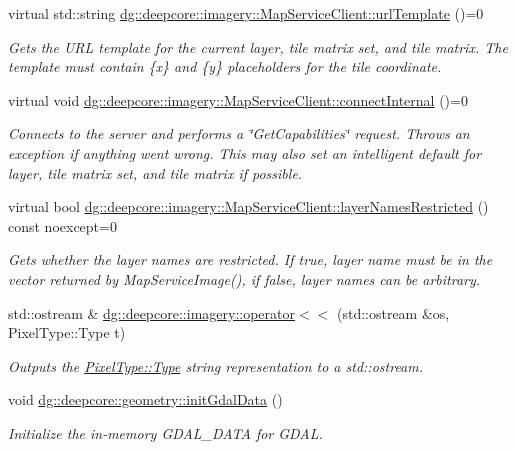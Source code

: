 \begin{DoxyCompactItemize}
virtual std\+::string \hyperlink{group___imagery_module_gaafa4e8cc2a047f6467e227603ccf1a23}{dg\+::deepcore\+::imagery\+::\+Map\+Service\+Client\+::url\+Template} ()=0
\begin{DoxyCompactList}\small\item\em Gets the U\+RL template for the current layer, tile matrix set, and tile matrix. The template must contain \{x\} and \{y\} placeholders for the tile coordinate. \end{DoxyCompactList}\item 
virtual void \hyperlink{group___imagery_module_gabba13ea72115a1196ed44e35cc17f1b9}{dg\+::deepcore\+::imagery\+::\+Map\+Service\+Client\+::connect\+Internal} ()=0
\begin{DoxyCompactList}\small\item\em Connects to the server and performs a \char`\"{}\+Get\+Capabilities\char`\"{} request. Throws an exception if anything went wrong. This may also set an intelligent default for layer, tile matrix set, and tile matrix if possible. \end{DoxyCompactList}\item 
virtual bool \hyperlink{group___imagery_module_ga900665eb2167743cdac5e46ac536c209}{dg\+::deepcore\+::imagery\+::\+Map\+Service\+Client\+::layer\+Names\+Restricted} () const noexcept=0
\begin{DoxyCompactList}\small\item\em Gets whether the layer names are restricted. If true, layer name must be in the vector returned by Map\+Service\+Image(), if false, layer names can be arbitrary. \end{DoxyCompactList}\item 
std\+::ostream \& \hyperlink{group___imagery_module_ga46f637f6cee80168d9ad3724aa75c7df}{dg\+::deepcore\+::imagery\+::operator$<$$<$} (std\+::ostream \&os, Pixel\+Type\+::\+Type t)
\begin{DoxyCompactList}\small\item\em Outputs the \hyperlink{namespacedg_1_1deepcore_1_1imagery_1_1_pixel_type_a5f0c62edf4601cbd15e52b381697069d}{Pixel\+Type\+::\+Type} string representation to a {\ttfamily std\+::ostream}. \end{DoxyCompactList}\item 
void \hyperlink{group___imagery_module_ga44c5fa041d6209a58a20bc5f4791aecc}{dg\+::deepcore\+::geometry\+::init\+Gdal\+Data} ()
\begin{DoxyCompactList}\small\item\em Initialize the in-\/memory G\+D\+A\+L\+\_\+\+D\+A\+TA for G\+D\+AL.


\end{DoxyCompactList}
\end{DoxyCompactItemize}
